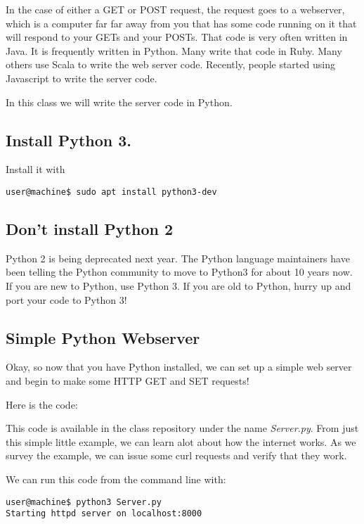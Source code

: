 \documentclass[10pt]{article}
\begin{document}
In the case of either a GET or POST request, the request goes to a webserver, which is a computer far far away from you that has some code running on it that will respond to your GETs and your POSTs. That code is very often written in Java. It is frequently written in Python. Many write that code in Ruby. Many others use Scala to write the web server code. Recently, people started using Javascript to write the server code. 

In this class we will write the server code in Python.

\subsection{Install Python 3.}

Install it with 

\begin{lstlisting}
user@machine$ sudo apt install python3-dev
\end{lstlisting}

\subsection{Don't install Python 2}
Python 2 is being deprecated next year. The Python language maintainers have been telling the Python community to move to Python3 for about 10 years now. If you are new to Python, use Python 3. If you are old to Python, hurry up and port your code to Python 3!

\subsection{Simple Python Webserver}
Okay, so now that you have Python installed, we can set up a simple web server and begin to make some HTTP GET and SET requests!

Here is the code:


This code is available in the class repository under the name \textit{Server.py}. From just this simple little example, we can learn alot about how the internet works. As we survey the example, we can issue some curl requests and verify that they work.

We can run this code from the command line with:

\begin{lstlisting}
user@machine$ python3 Server.py
Starting httpd server on localhost:8000
\end{lstlisting}
\end{document}
